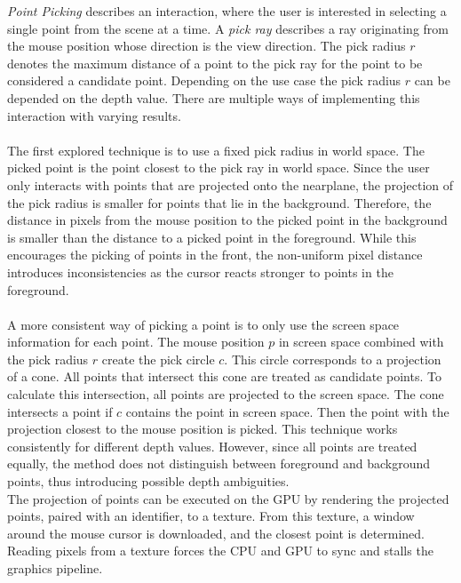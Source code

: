 \textit{Point Picking} describes an interaction, where the user is interested in selecting a single point from the scene at a time. A \textit{pick ray} describes a ray originating from the mouse position whose direction is the view direction. The pick radius $r$ denotes the maximum distance of a point to the pick ray for the point to be considered a candidate point. Depending on the use case the pick radius $r$ can be depended on the depth value. There are multiple ways of implementing this interaction with varying results. 
\\
\\
The first explored technique is to use a fixed pick radius in world space. The picked point is the point closest to the pick ray in world space. Since the user only interacts with points that are projected onto the nearplane, the projection of the pick radius is smaller for points that lie in the background. Therefore, the distance in pixels from the mouse position to the picked point in the background is smaller than the distance to a picked point in the foreground. While this encourages the picking of points in the front, the non-uniform pixel distance introduces inconsistencies as the cursor reacts stronger to points in the foreground. 
\\
\\
A more consistent way of picking a point is to only use the screen space information for each point. The mouse position $p$ in screen space combined with the pick radius $r$ create the pick circle $c$. This circle corresponds to a projection of a cone. All points that intersect this cone are treated as candidate points. To calculate this intersection, all points are projected to the screen space. The cone intersects a point if $c$ contains the point in screen space. Then the point with the projection closest to the mouse position is picked. This technique works consistently for different depth values. However, since all points are treated equally, the method does not distinguish between foreground and background points, thus introducing possible depth ambiguities. 
\\
The projection of points can be executed on the GPU by rendering the projected points, paired with an identifier, to a texture. From this texture, a window around the mouse cursor is downloaded, and the closest point is determined. Reading pixels from a texture forces the CPU and GPU to sync and stalls the graphics pipeline. 
\\
\\
